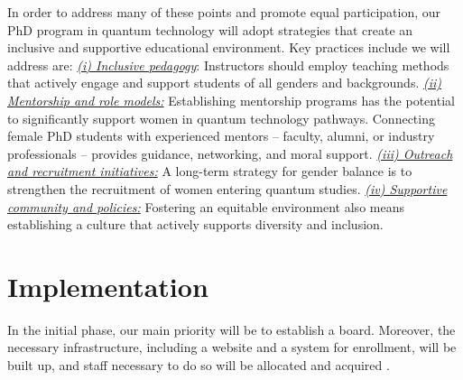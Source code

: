 \documentclass{scrreprt}
\begin{document}
In order to address many of these points and promote equal
participation, our PhD program in quantum technology will adopt
strategies that create an inclusive and supportive educational
environment. Key practices include we will address are: \underline{\textit{ (i) Inclusive pedagogy}}: Instructors should employ teaching methods that actively engage and support students of all genders and backgrounds. \underline{\textit{ (ii) Mentorship and role models:}} Establishing mentorship programs has the potential to  significantly support women in quantum technology pathways. Connecting female PhD students with experienced mentors – faculty, alumni, or industry professionals – provides guidance, networking, and moral support. \underline{\textit{ (iii) Outreach and recruitment initiatives:}} A long-term strategy for gender balance is to strengthen the recruitment of women entering quantum studies. 
\underline{\textit{ (iv) Supportive community and policies:}} Fostering an equitable environment also means establishing a culture that actively supports diversity and inclusion. 


\section{Implementation}

In the initial phase, our main priority will be to establish a board. Moreover, the necessary infrastructure, including a website and a system for enrollment, will be built up, and staff necessary to do so will be allocated and acquired .
\end{document}
